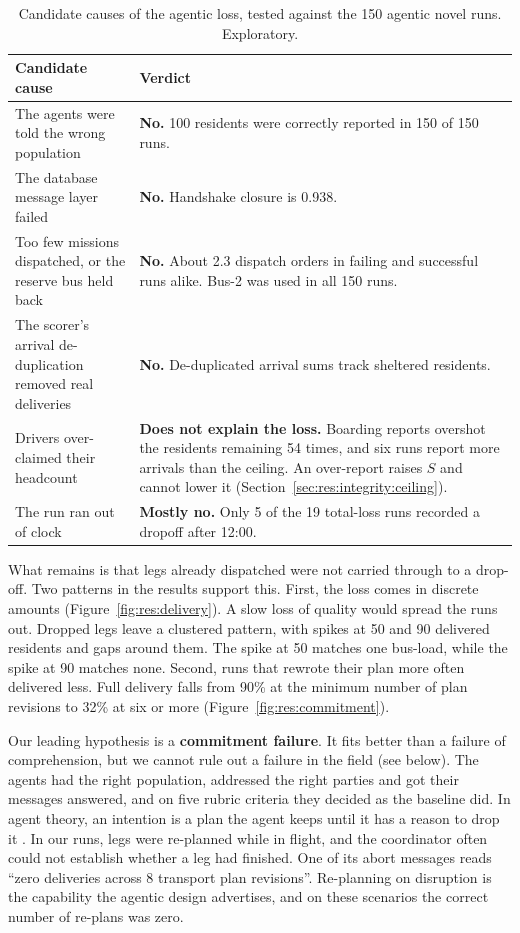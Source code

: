 \begin{table}[htbp]
\centering
\caption[Candidate causes of the agentic loss, and the verdict on each]{Candidate
causes of the agentic loss, tested against the 150 agentic novel runs.
Exploratory.}
\label{tab:disc:ruledout}
\small
\begin{tabularx}{\textwidth}{>{\raggedright\arraybackslash}p{5.2cm}>{\raggedright\arraybackslash}X}
\toprule
Candidate cause & Verdict \\
\midrule
The agents were told the wrong population & \textbf{No.} 100 residents were correctly reported in 150 of 150 runs. \\
The database message layer failed & \textbf{No.} Handshake closure is 0.938. \\
Too few missions dispatched, or the reserve bus held back & \textbf{No.} About 2.3 dispatch orders in failing and successful runs alike. Bus-2 was used in all 150 runs. \\
The scorer's arrival de-duplication removed real deliveries & \textbf{No.} De-duplicated arrival sums track sheltered residents. \\
Drivers over-claimed their headcount & \textbf{Does not explain the loss.} Boarding reports overshot the residents remaining 54 times, and six runs report more arrivals than the ceiling. An over-report raises $S$ and cannot lower it (Section~\ref{sec:res:integrity:ceiling}). \\
The run ran out of clock & \textbf{Mostly no.} Only 5 of the 19 total-loss runs recorded a dropoff after 12:00. \\
\bottomrule
\end{tabularx}
\end{table}

What remains is that legs already dispatched were not carried through to a
drop-off. Two patterns in the results support this. First, the loss comes in
discrete amounts (Figure~\ref{fig:res:delivery}). A slow loss of quality would
spread the runs out. Dropped legs leave a clustered pattern, with spikes at 50 and 90 delivered residents and gaps around them. The
spike at 50 matches one bus-load, while the spike at 90 matches none. Second,
runs that rewrote their plan more often delivered less. Full delivery falls
from 90\% at the minimum number of plan revisions to 32\% at six or more
(Figure~\ref{fig:res:commitment}).

Our leading hypothesis is a \textbf{commitment failure}. It fits better than a
failure of comprehension, but we cannot rule out a failure in the field (see
below). The agents had the right population, addressed the right
parties and got their messages answered, and on five rubric criteria they
decided as the baseline did. In agent theory, an intention is a plan the agent
keeps until it has a reason to drop it \parencite{rao1995}. In our runs, legs were
re-planned while in flight, and the coordinator often could not establish
whether a leg had finished. One of its abort messages reads ``zero deliveries
across 8 transport plan revisions''. Re-planning on disruption is the
capability the agentic design advertises, and on these scenarios the correct
number of re-plans was zero.

